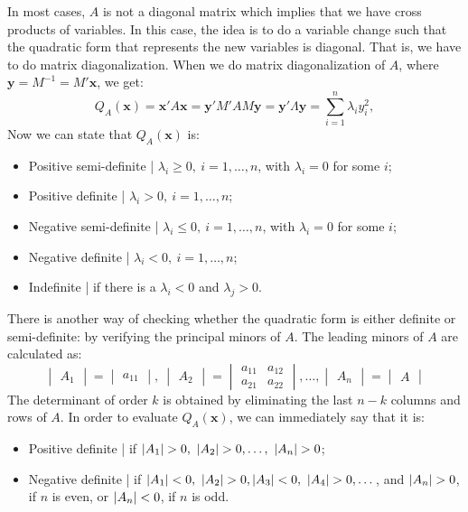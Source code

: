 \documentclass[0pt, a4paper]{article}
\begin{document}
In most cases, $A$ is not a diagonal matrix which implies that we have cross products of variables. In this case, the idea is to do a variable change such that the quadratic form that represents the new variables is diagonal. That is, we have to do matrix diagonalization. When we do matrix diagonalization of $A$, where $\textbf{y}=M^{-1}=M'\textbf{x}$, we get:
$$Q_A(\textbf{x})=\textbf{x}'A\textbf{x}=\textbf{y}'M'AM\textbf{y}=\textbf{y}'\Lambda\textbf{y}=\sum_{i=1}^{n}\lambda_iy_i^2,$$
Now we can state that $Q_A(\textbf{x})$ is:
\begin{itemize}
	\item Positive semi-definite | $\lambda_i\geq0,\ i=1,\dots,n$, with $\lambda_i=0$ for some $i$;
	\item Positive definite | $\lambda_i>0,\ i=1,\dots,n$;
	\item Negative semi-definite | $\lambda_i\leq0,\ i=1,\dots,n$, with $\lambda_i=0$ for some $i$;
	\item Negative definite | $\lambda_i<0,\ i=1,\dots,n$;
	\item Indefinite | if there is a $\lambda_i<0$ and $\lambda_j>0$.
\end{itemize}

There is another way of checking  whether the quadratic form is either definite or semi-definite: by verifying the principal minors of $A$. The leading minors of $A$ are calculated as:
$$\begin{vmatrix}
A_1
\end{vmatrix}
=
\begin{vmatrix}
a_{11}
\end{vmatrix}
,\ 
\begin{vmatrix}
A_2
\end{vmatrix}
=
\begin{vmatrix}
a_{11} & a_{12}\\ 
a_{21} & a_{22}
\end{vmatrix}
,\dots,
\begin{vmatrix}
A_n
\end{vmatrix}
=
\begin{vmatrix}
A
\end{vmatrix}$$
The determinant of order $k$ is obtained by eliminating the last $n-k$ columns and rows of $A$. In order to evaluate $Q_A(\textbf{x})$, we can immediately say that it is:
\begin{itemize}
	\item Positive definite | if $\abs{A_1}>0,\ \abs{A_2}>0,\dots,\ \abs{A_n}>0$;
	\item Negative definite | if $\abs{A_1}<0,\ \abs{A_2}>0, \abs{A_3}<0,\ \abs{A_4}>0,\dots$, and $\abs{A_n}>0$, if $n$ is even, or $\abs{A_n}<0$, if $n$ is odd.
\end{itemize}
\end{document}
